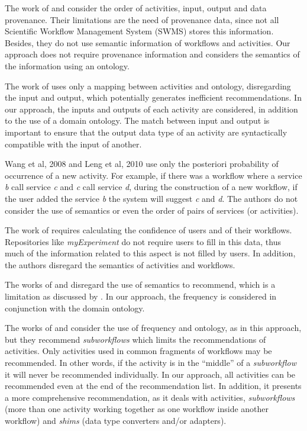 \documentclass{RITA}
\begin{document}
The work of \cite{Koop2008, Oliveira2008, Wang2009, Zhang2009, Tan2011, Cao2012, Diamantini2012} and \cite{Garijo2013, Yeo2013} consider the order of activities, input, output and data provenance. Their limitations are the need of provenance data, since not all Scientific Workflow Management System (SWMS) stores this information. Besides, they do not use semantic information of workflows and activities. Our approach does not require provenance information and considers the semantics of the information using an ontology.

The work of \cite{Bomfim2005} uses only a mapping between activities and ontology, disregarding the input and output, which potentially generates inefficient recommendations. In our approach, the inputs and outputs of each activity are considered, in addition to the use of a domain ontology. The match between input and output is important to ensure that the output data type of an activity are syntactically compatible with the input of another.

Wang et al, 2008\nocite{Wang2008} and Leng et al, 2010\nocite{Leng2010} use only the posteriori probability of occurrence of a new activity. For example, if there was a workflow where a service \emph{b} call service \emph{c} and \emph{c} call service \emph{d}, during the construction of a new workflow, if the user added the service \emph{b} the system will suggest \emph{c} and \emph{d}. The authors do not consider the use of semantics or even the order of pairs of services (or activities).

The work of \cite{Yao2012} requires calculating the confidence of users and of their workflows. Repositories like \emph{myExperiment} do not require users to fill in this data, thus much of the information related to this aspect is not filled by users. In addition, the authors disregard the semantics of activities and workflows.

The works of \cite{Telea1999, Oliveir2010} and \cite{Zhang2011} disregard the use of semantics to recommend, which is a limitation as discussed by \cite{CorchoGarijo2014, Soomro2015}. In our approach, the frequency is considered in conjunction with the domain ontology.

The works of \cite{CorchoGarijo2014} and \cite{Soomro2015} consider the use of frequency and ontology, as in this approach, but they recommend \emph{subworkflows} which limits the recommendations of activities. Only activities used in common fragments of workflows may be recommended. In other words, if the activity is in the ``middle'' of a \emph{subworkflow} it will never be recommended individually. In our approach, all activities can be recommended even at the end of the recommendation list. In addition, it presents a more comprehensive recommendation, as it deals with activities, \emph{subworkflows} (more than one activity working together as one workflow inside another workflow) and \emph{shims} (data type converters and/or adapters).
\end{document}
